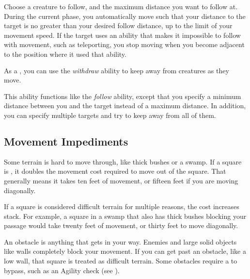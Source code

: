         \begin{freeability}{}
            Choose a creature to follow, and the maximum distance you want to follow at.
            During the current phase, you automatically move such that your distance to the target is no greater than your desired follow distance, up to the limit of your movement speed.
            If the target uses an ability that makes it impossible to follow with movement, such as teleporting, you stop moving when you become adjacent to the position where it used that ability.
        \end{freeability}

         As a , you can use the \textit{withdraw} ability to keep away from creatures as they move.

        \begin{freeability}{}
            This ability functions like the \textit{follow} ability, except that you specify a minimum distance between you and the target instead of a maximum distance.
            In addition, you can specify multiple targets and try to keep away from all of them.
        \end{freeability}

    \subsection{Movement Impediments}

        \label{Difficult Terrain}
        Some terrain is hard to move through, like thick bushes or a swamp.
        If a square is , it doubles the movement cost required to move out of the square.
        That generally means it takes ten feet of movement, or fifteen feet if you are moving diagonally.

        If a square is considered difficult terrain for multiple reasons, the cost increases stack.
        For example, a square in a swamp that also has thick bushes blocking your passage would take twenty feet of movement, or thirty feet to move diagonally.

        An obstacle is anything that gets in your way. Enemies and large solid objects like walls completely block your movement. If you can get past an obstacle, like a low wall, that square is treated as difficult terrain. Some obstacles require a  to bypass, such as an Agility check (see ).

